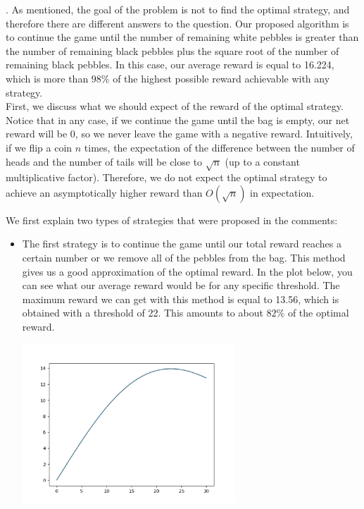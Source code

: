 \begin{solution}.
As mentioned, the goal of the problem is not to find the optimal strategy, and therefore there are different answers to the question. Our proposed algorithm is to continue the game until the number of remaining white pebbles is greater than the number of remaining black pebbles plus the square root of the number of remaining black pebbles. In this case, our average reward is equal to 16.224, which is more than $98\%$ of the highest possible reward achievable with any strategy.\\[0.2cm]

First, we discuss what we should expect of the reward of the optimal strategy. Notice that in any case, if we continue the game until the bag is empty, our net reward will be 0, so we never leave the game with a negative reward. Intuitively, if we flip a coin $n$ times, the expectation of the difference between the number of heads and the number of tails will be close to $\sqrt{n}$ (up to a constant multiplicative factor). Therefore, we do not expect the optimal strategy to  achieve an asymptotically higher reward than $O(\sqrt{n})$ in expectation. 


We first explain two types of strategies that were proposed in the comments:

\begin{itemize}
\item The first strategy is to continue the game until our total reward reaches a certain number or we remove all of the pebbles from the bag. This method gives us a good approximation of the optimal reward. In the plot below, you can see what our average reward would be for any specific threshold. The maximum reward we can get with this method is equal to 13.56, which is obtained with a threshold of 22. This amounts to about $82\%$ of the optimal reward.

\begin{center}
	\includegraphics[width=8cm]{20/figs/20_diagram1.jpg}
\end{center}


\end{itemize}
\end{solution}
